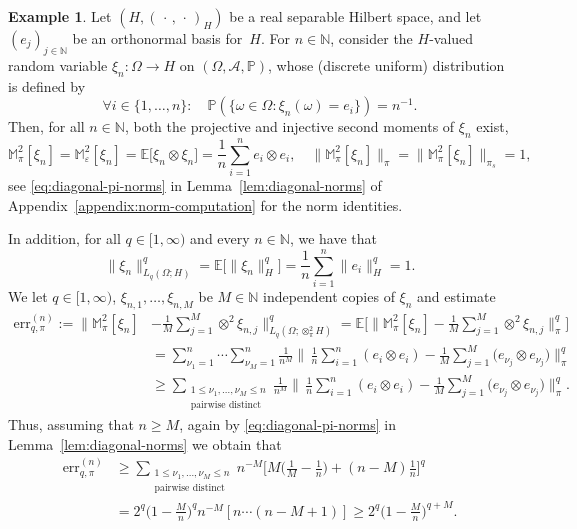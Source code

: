 \documentclass[reqno]{amsart}
\numberwithin{equation}{section}
\newcommand{\bbE}{\mathbb{E}}
\newcommand{\bbM}{\mathbb{M}}
\newcommand{\bbN}{\mathbb{N}}
\newcommand{\bbP}{\mathbb{P}}
\newcommand{\cA}{\mathcal{A}}
\newcommand{\norm}[2]{     \| #1       \|_{ #2 }}
\newcommand{\scalar}[2]{     ( #1       )_{ #2 }}
\newcommand{\from}{\colon}
\newcommand{\eps}{\varepsilon}
\theoremstyle{remark}
\theoremstyle{definition}
\newtheorem{example}[lemma]{Example}
\begin{document}
\begin{example}\label{example:projective-bad} 
	Let $(H, \scalar{\,\cdot\,, \,\cdot\,}{H})$ 
	be a real separable Hilbert space, 
	and let $(e_j)_{j\in\bbN}$ be an orthonormal basis for~$H$. 
	For $n\in\bbN$, consider the $H$-valued random variable 
	$\xi_n\from \Omega\to H$ on $(\Omega,\cA,\bbP)$, 
	whose (discrete uniform) distribution 
	is defined by 
	\[
	\forall i \in \{1,\ldots,n\}: 
	\quad 
	\bbP( \{\omega\in\Omega : \xi_n(\omega) = e_i\} ) 
	= n^{-1}\!. 
	\]
	Then, for all $n\in\bbN$, 
	both the projective and injective second moments 
	of $\xi_n$ exist,   
	\[
	\bbM^2_\pi[\xi_n] 
	= 
	\bbM^2_\eps[\xi_n] 
	= 
	\bbE\bigl[\xi_n\otimes \xi_n\bigr] 
	= 
	\frac{1}{n} \sum_{i=1}^n e_i \otimes e_i, 
	\quad 
	\bigl\| \bbM^2_\pi[\xi_n] \bigr\|_{\pi}
	= 
	\bigl\| \bbM^2_\pi[\xi_n] \bigr\|_{\pi_s}
	=
	1, 
	\]
	see \eqref{eq:diagonal-pi-norms} in Lemma~\ref{lem:diagonal-norms} 
	of Appendix~\ref{appendix:norm-computation} for the  
	norm identities. 
	
	In addition,  
	for  all $q\in[1,\infty)$ 
	and every 
	$n\in\bbN$,  
	we have that 
	\[
	\norm{\xi_n}{L_q(\Omega;H)}^q 
	= 
	\bbE\bigl[ \norm{\xi_n}{H}^q \bigr] 
	= 
	\frac{1}{n} 
	\sum_{i=1}^n 
	\norm{e_i}{H}^q  
	= 
	1. 
	\]
	We let $q\in[1,\infty)$, 
	$\xi_{n,1},\ldots,\xi_{n,M}$ be $M\in\bbN$ independent 
	copies of $\xi_n$ and estimate 
	\begin{align*} 
	\mathrm{err}_{q,\pi}^{(n)} 
	:=
	\biggl\| 
	\bbM^2_\pi [\xi_n] 
	&-
	\frac{1}{M} 
	\sum_{j=1}^M 
	\otimes^2 \xi_{n,j} 
	\biggr\|_{L_q(\Omega; \otimes_\pi^2 H)}^q 
	= 
	\bbE
	\Biggl[ 
	\biggl\| 
	\bbM^2_\pi [\xi_n] 
	- 
	\frac{1}{M} 
	\sum_{j=1}^M 
	\otimes^2 \xi_{n,j} 
	\biggr\|_\pi^q 
	\Biggr] 
	\\
	&= 
	\sum_{\nu_1 = 1}^n  
	\cdots
	\sum_{\nu_M = 1}^n 
	\frac{1}{n^M} 
	\biggl\| \, 
	\frac{1}{n} 
	\sum_{i=1}^n 
	( e_i \otimes e_i )
	- 
	\frac{1}{M} 
	\sum_{j=1}^M 
	\bigl( e_{\nu_j} \otimes e_{\nu_j} \bigr)
	\biggr\|_\pi^q 
	\\
	&\geq 
	\sum_{\substack{1 \leq \nu_1,\ldots,\nu_M \leq n \\ \text{pairwise distinct}}} 
	\frac{1}{n^M} 
	\biggl\| \, 
	\frac{1}{n} 
	\sum_{i=1}^n 
	( e_i \otimes e_i )
	- 
	\frac{1}{M} 
	\sum_{j=1}^M 
	\bigl( e_{\nu_j} \otimes e_{\nu_j} \bigr)
	\biggr\|_\pi^q . 
	\end{align*} 
	Thus, 
	assuming that $n\geq M$, 
	again by \eqref{eq:diagonal-pi-norms} 
	in Lemma~\ref{lem:diagonal-norms} 
	we obtain that 
	\begin{align*} 
	\mathrm{err}_{q,\pi}^{(n)} 
	&\geq 
	\sum_{\substack{1 \leq \nu_1,\ldots,\nu_M \leq n \\ \text{pairwise distinct}}} 
	n^{-M} 
	\bigl[ 
	M \bigl( \tfrac{1}{M} - \tfrac{1}{n} \bigr) 
	+ 
	(n-M) \tfrac{1}{n} 
	\bigr]^q 
	\\
	&= 
	2^q  
	\bigl( 1 - \tfrac{M}{n} \bigr)^q 
	n^{-M} 
	[ n \cdots (n-M+1) ] 
	\geq 
	2^q 
	\bigl( 1 - \tfrac{M}{n} \bigr)^{q+M} \! . 
	\end{align*} 
	

\end{example}
\end{document}

